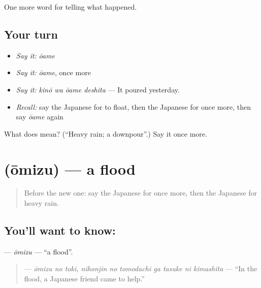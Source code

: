 \begin{grammarlens}[title={What you've built}]
One more word for telling what happened.
\end{grammarlens}

\subsection*{Your turn}
\begin{itemize}
\raggedright
  \item \emph{Say it:} \emph{ōame}
  \item \emph{Say it:} \emph{ōame}, once more
  \item \emph{Say it:} \emph{kinō wa ōame deshita} — It poured yesterday.
  \item \emph{Recall:} say the Japanese for to float, then the Japanese for once more, then say \emph{ōame} again
\end{itemize}

\begin{tcolorbox}[breakable,colback=teal!4,colframe=teal!35!black,title={Before you move on}]
What does  mean? (\textquotedblleft{}Heavy rain; a downpour\textquotedblright{}.) Say it once more.
\end{tcolorbox}
\section[\texorpdfstring{\ja{おおみず} (ōmizu)}{おおみず (ōmizu)}]{ (ōmizu) — a flood}

\label{lesson:JA-C276-oumizu}



\begin{quote}
Before the new one: say the Japanese for once more, then the Japanese for heavy rain.
\end{quote}

\subsection*{You'll want to know: }
\textbf{} — \emph{ōmizu} — \textquotedblleft{}a flood\textquotedblright{}.

\begin{quote}
\textbf{    } — \emph{ōmizu no toki, nihonjin no tomodachi ga tasuke ni kimashita} — \textquotedblleft{}In the flood, a Japanese friend came to help.\textquotedblright{}
\end{quote}

